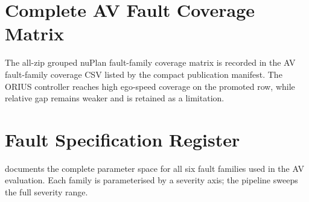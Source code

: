 \section{Complete AV Fault Coverage Matrix}\label{app:av_fault_full}

The all-zip grouped nuPlan fault-family coverage matrix is recorded in the AV
fault-family coverage CSV listed by the compact publication manifest.
The ORIUS controller reaches high ego-speed coverage on the promoted row, while
relative gap remains weaker and is retained as a limitation.

\section{Fault Specification Register}\label{app:fault_specs}

 documents the complete parameter space for all six
fault families used in the AV evaluation.  Each family is parameterised by a severity
axis; the pipeline sweeps the full severity range.

